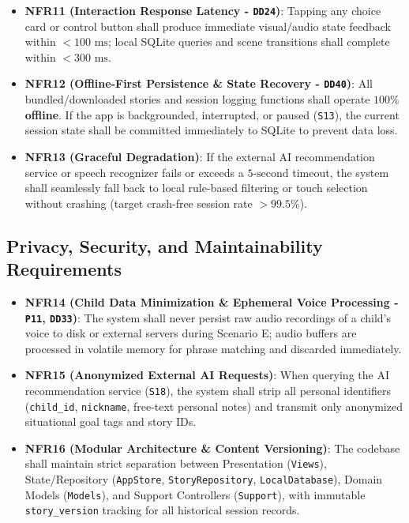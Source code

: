 \begin{itemize}
  \item \textbf{NFR11 (Interaction Response Latency - \texttt{DD24})}: Tapping any choice card or control button shall produce immediate visual/audio state feedback within \textbf{$< 100\text{ ms}$}; local SQLite queries and scene transitions shall complete within \textbf{$< 300\text{ ms}$}.
  \item \textbf{NFR12 (Offline-First Persistence \& State Recovery - \texttt{DD40})}: All bundled/downloaded stories and session logging functions shall operate \textbf{$100\%$ offline}. If the app is backgrounded, interrupted, or paused (\texttt{S13}), the current session state shall be committed immediately to SQLite to prevent data loss.
  \item \textbf{NFR13 (Graceful Degradation)}: If the external AI recommendation service or speech recognizer fails or exceeds a \textbf{$5\text{-second}$} timeout, the system shall seamlessly fall back to local rule-based filtering or touch selection without crashing (target crash-free session rate $> 99.5\%$).
\end{itemize}



\subsection{Privacy, Security, and Maintainability Requirements}


\begin{itemize}
  \item \textbf{NFR14 (Child Data Minimization \& Ephemeral Voice Processing - \texttt{P11}, \texttt{DD33})}: The system shall never persist raw audio recordings of a child's voice to disk or external servers during Scenario E; audio buffers are processed in volatile memory for phrase matching and discarded immediately.
  \item \textbf{NFR15 (Anonymized External AI Requests)}: When querying the AI recommendation service (\texttt{S18}), the system shall strip all personal identifiers (\texttt{child\_id}, \texttt{nickname}, free-text personal notes) and transmit only anonymized situational goal tags and story IDs.
  \item \textbf{NFR16 (Modular Architecture \& Content Versioning)}: The codebase shall maintain strict separation between Presentation (\texttt{Views}), State/Repository (\texttt{AppStore}, \texttt{StoryRepository}, \texttt{LocalDatabase}), Domain Models (\texttt{Models}), and Support Controllers (\texttt{Support}), with immutable \texttt{story\_version} tracking for all historical session records.
\end{itemize}



